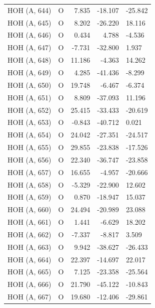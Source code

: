 \begin{longtable}{@{}lcrr@{}}
  \cmidrule(r){1-5}
  HOH (A, 644) & O & 7.835 & -18.107 & -25.842 \\
  \cmidrule(r){1-5}
  HOH (A, 645) & O & 8.202 & -26.220 & 18.116 \\
  \cmidrule(r){1-5}
  HOH (A, 646) & O & 0.434 & 4.788 & -4.536 \\
  \cmidrule(r){1-5}
  HOH (A, 647) & O & -7.731 & -32.800 & 1.937 \\
  \cmidrule(r){1-5}
  HOH (A, 648) & O & 11.186 & -4.363 & 14.262 \\
  \cmidrule(r){1-5}
  HOH (A, 649) & O & 4.285 & -41.436 & -8.299 \\
  \cmidrule(r){1-5}
  HOH (A, 650) & O & 19.748 & -6.467 & -6.374 \\
  \cmidrule(r){1-5}
  HOH (A, 651) & O & 8.809 & -37.093 & 11.196 \\
  \cmidrule(r){1-5}
  HOH (A, 652) & O & 25.415 & -33.433 & -20.619 \\
  \cmidrule(r){1-5}
  HOH (A, 653) & O & -0.843 & -40.712 & 0.021 \\
  \cmidrule(r){1-5}
  HOH (A, 654) & O & 24.042 & -27.351 & -24.517 \\
  \cmidrule(r){1-5}
  HOH (A, 655) & O & 29.855 & -23.838 & -17.526 \\
  \cmidrule(r){1-5}
  HOH (A, 656) & O & 22.340 & -36.747 & -23.858 \\
  \cmidrule(r){1-5}
  HOH (A, 657) & O & 16.655 & -4.957 & -20.666 \\
  \cmidrule(r){1-5}
  HOH (A, 658) & O & -5.329 & -22.900 & 12.602 \\
  \cmidrule(r){1-5}
  HOH (A, 659) & O & 0.870 & -18.947 & 15.037 \\
  \cmidrule(r){1-5}
  HOH (A, 660) & O & 24.494 & -20.989 & 23.088 \\
  \cmidrule(r){1-5}
  HOH (A, 661) & O & 1.441 & -6.629 & 18.202 \\
  \cmidrule(r){1-5}
  HOH (A, 662) & O & -7.337 & -8.817 & 3.509 \\
  \cmidrule(r){1-5}
  HOH (A, 663) & O & 9.942 & -38.627 & -26.433 \\
  \cmidrule(r){1-5}
  HOH (A, 664) & O & 22.397 & -14.697 & 22.017 \\
  \cmidrule(r){1-5}
  HOH (A, 665) & O & 7.125 & -23.358 & -25.564 \\
  \cmidrule(r){1-5}
  HOH (A, 666) & O & 21.790 & -45.122 & -10.843 \\
  \cmidrule(r){1-5}
  HOH (A, 667) & O & 19.680 & -12.406 & -29.861 \\

\end{longtable}
